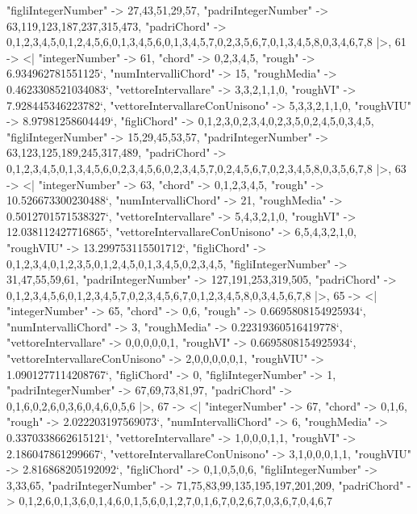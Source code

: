 \documentclass[
]{article}
\begin{document}
\begin{DatasetVerbatim}
    "figliIntegerNumber" -> {27,43,51,29,57},
    "padriIntegerNumber" -> {63,119,123,187,237,315,473},
    "padriChord" -> {{0,1,2,3,4,5},{0,1,2,4,5,6},{0,1,3,4,5,6},{0,1,3,4,5,7},{0,2,3,5,6,7},{0,1,3,4,5,8},{0,3,4,6,7,8}}
  |>,
  61 -> <|
    "integerNumber" -> 61,
    "chord" -> {0,2,3,4,5},
    "rough" -> 6.934962781551125`,
    "numIntervalliChord" -> 15,
    "roughMedia" -> 0.4623308521034083`,
    "vettoreIntervallare" -> {3,3,2,1,1,0},
    "roughVI" -> 7.928445346223782`,
    "vettoreIntervallareConUnisono" -> {5,3,3,2,1,1,0},
    "roughVIU" -> 8.97981258604449`,
    "figliChord" -> {{0,1,2,3},{0,2,3,4},{0,2,3,5},{0,2,4,5},{0,3,4,5}},
    "figliIntegerNumber" -> {15,29,45,53,57},
    "padriIntegerNumber" -> {63,123,125,189,245,317,489},
    "padriChord" -> {{0,1,2,3,4,5},{0,1,3,4,5,6},{0,2,3,4,5,6},{0,2,3,4,5,7},{0,2,4,5,6,7},{0,2,3,4,5,8},{0,3,5,6,7,8}}
  |>,
  63 -> <|
    "integerNumber" -> 63,
    "chord" -> {0,1,2,3,4,5},
    "rough" -> 10.526673300230488`,
    "numIntervalliChord" -> 21,
    "roughMedia" -> 0.5012701571538327`,
    "vettoreIntervallare" -> {5,4,3,2,1,0},
    "roughVI" -> 12.038112427716865`,
    "vettoreIntervallareConUnisono" -> {6,5,4,3,2,1,0},
    "roughVIU" -> 13.299753115501712`,
    "figliChord" -> {{0,1,2,3,4},{0,1,2,3,5},{0,1,2,4,5},{0,1,3,4,5},{0,2,3,4,5}},
    "figliIntegerNumber" -> {31,47,55,59,61},
    "padriIntegerNumber" -> {127,191,253,319,505},
    "padriChord" -> {{0,1,2,3,4,5,6},{0,1,2,3,4,5,7},{0,2,3,4,5,6,7},{0,1,2,3,4,5,8},{0,3,4,5,6,7,8}}
  |>,
  65 -> <|
    "integerNumber" -> 65,
    "chord" -> {0,6},
    "rough" -> 0.6695808154925934`,
    "numIntervalliChord" -> 3,
    "roughMedia" -> 0.22319360516419778`,
    "vettoreIntervallare" -> {0,0,0,0,0,1},
    "roughVI" -> 0.6695808154925934`,
    "vettoreIntervallareConUnisono" -> {2,0,0,0,0,0,1},
    "roughVIU" -> 1.0901277114208767`,
    "figliChord" -> {{0}},
    "figliIntegerNumber" -> {1},
    "padriIntegerNumber" -> {67,69,73,81,97},
    "padriChord" -> {{0,1,6},{0,2,6},{0,3,6},{0,4,6},{0,5,6}}
  |>,
  67 -> <|
    "integerNumber" -> 67,
    "chord" -> {0,1,6},
    "rough" -> 2.022203197569073`,
    "numIntervalliChord" -> 6,
    "roughMedia" -> 0.3370338662615121`,
    "vettoreIntervallare" -> {1,0,0,0,1,1},
    "roughVI" -> 2.186047861299667`,
    "vettoreIntervallareConUnisono" -> {3,1,0,0,0,1,1},
    "roughVIU" -> 2.816868205192092`,
    "figliChord" -> {{0,1},{0,5},{0,6}},
    "figliIntegerNumber" -> {3,33,65},
    "padriIntegerNumber" -> {71,75,83,99,135,195,197,201,209},
    "padriChord" -> {{0,1,2,6},{0,1,3,6},{0,1,4,6},{0,1,5,6},{0,1,2,7},{0,1,6,7},{0,2,6,7},{0,3,6,7},{0,4,6,7}}

\end{DatasetVerbatim}
\end{document}
